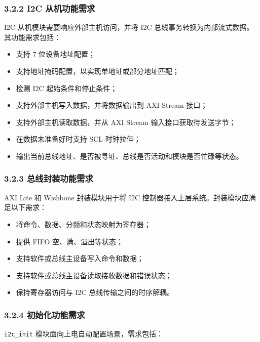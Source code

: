 \subsubsection{3.2.2 I2C
从机功能需求}\label{i2c-ux4eceux673aux529fux80fdux9700ux6c42}

I2C 从机模块需要响应外部主机访问，并将 I2C
总线事务转换为内部流式数据。其功能需求包括：

\begin{itemize}
\tightlist
\item
  支持 7 位设备地址配置；
\item
  支持地址掩码配置，以实现单地址或部分地址匹配；
\item
  检测 I2C 起始条件和停止条件；
\item
  支持外部主机写入数据，并将数据输出到 AXI Stream 接口；
\item
  支持外部主机读取数据，并从 AXI Stream 输入接口获取待发送字节；
\item
  在数据未准备好时支持 SCL 时钟拉伸；
\item
  输出当前总线地址、是否被寻址、总线是否活动和模块是否忙碌等状态。
\end{itemize}

\subsubsection{3.2.3
总线封装功能需求}\label{ux603bux7ebfux5c01ux88c5ux529fux80fdux9700ux6c42}

AXI Lite 和 Wishbone 封装模块用于将 I2C
控制器接入上层系统。封装模块应满足以下需求：

\begin{itemize}
\tightlist
\item
  将命令、数据、分频和状态映射为寄存器；
\item
  提供 FIFO 空、满、溢出等状态；
\item
  支持软件或总线主设备写入命令和数据；
\item
  支持软件或总线主设备读取接收数据和错误状态；
\item
  保持寄存器访问与 I2C 总线传输之间的时序解耦。
\end{itemize}

\subsubsection{3.2.4
初始化功能需求}\label{ux521dux59cbux5316ux529fux80fdux9700ux6c42}

\texttt{i2c\_init} 模块面向上电自动配置场景，需求包括：

